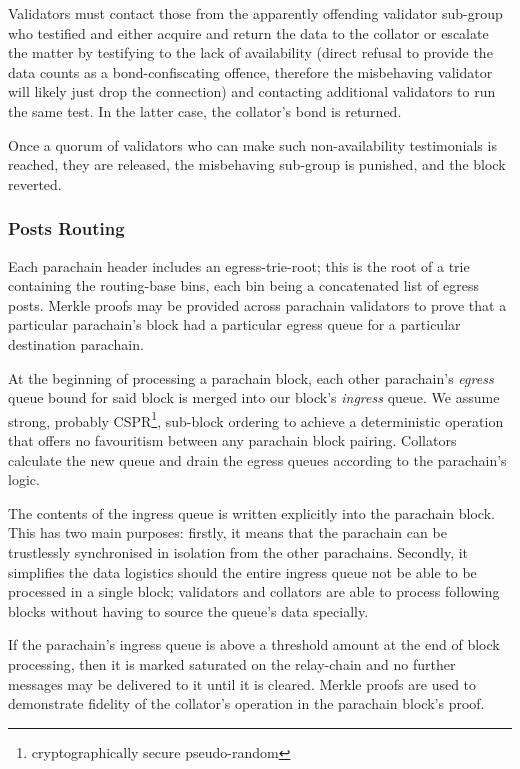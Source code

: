 \documentclass{beamer}
\begin{document}
\begin{frame}
 Validators must contact those from the apparently offending validator sub-group who testified and either acquire and return the data to the collator or escalate the matter by testifying to the lack of availability (direct refusal to provide the data counts as a bond-confiscating offence, therefore the misbehaving validator will likely just drop the connection) and contacting additional validators to run the same test. In the latter case, the collator's bond is returned.

 Once a quorum of validators who can make such non-availability testimonials is reached, they are released, the misbehaving sub-group is punished, and the block reverted.

\subsubsection{Posts Routing}
\label{posts-routing}

 Each parachain header includes an egress-trie-root; this is the root of a trie containing the routing-base bins, each bin being a concatenated list of egress posts. Merkle proofs may be provided across parachain validators to prove that a particular parachain's block had a particular egress queue for a particular destination parachain.

 At the beginning of processing a parachain block, each other parachain's \textit{egress} queue bound for said block is merged into our block's \textit{ingress} queue. We assume strong, probably CSPR\footnote{cryptographically secure pseudo-random}, sub-block ordering to achieve a deterministic operation that offers no favouritism between any parachain block pairing. Collators calculate the new queue and drain the egress queues according to the parachain's logic.

 The contents of the ingress queue is written explicitly into the parachain block. This has two main purposes: firstly, it means that the parachain can be trustlessly synchronised in isolation from the other parachains. Secondly, it simplifies the data logistics should the entire ingress queue not be able to be processed in a single block; validators and collators are able to process following blocks without having to source the queue's data specially.

 If the parachain's ingress queue is above a threshold amount at the end of block processing, then it is marked saturated on the relay-chain and no further messages may be delivered to it until it is cleared. Merkle proofs are used to demonstrate fidelity of the collator's operation in the parachain block's proof.


\end{frame}
\end{document}
